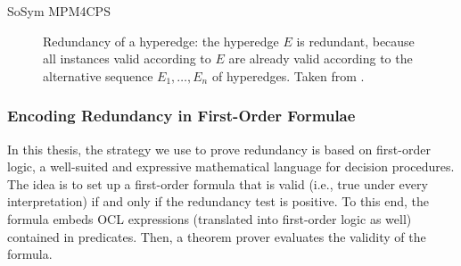 \begin{copiedFrom}{SoSym MPM4CPS}
\begin{figure}
    \centering
    
    \caption[Redundancy of a hyperedge]{Redundancy of a hyperedge: the hyperedge $E$ is redundant, because all instances valid according to $E$ are already valid according to the alternative sequence $E_1, \dots, E_n$ of hyperedges. Taken from .}
    \label{fig:correctness:prevention:comparison_validinstances}
\end{figure}

\subsubsection{Encoding Redundancy in First-Order Formulae}

In this thesis, the strategy we use to prove redundancy is based on first-order logic, a well-suited and expressive mathematical language for decision procedures. The idea is to set up a first-order formula that is valid (i.e., true under every interpretation) if and only if the redundancy test is positive. To this end, the formula embeds OCL expressions (translated into first-order logic as well) contained in predicates. Then, a theorem prover evaluates the validity of the formula. 


\end{copiedFrom}
